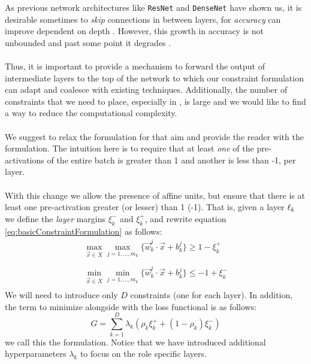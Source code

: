 As previous network architectures like \texttt{ResNet} and \texttt{DenseNet} have shown us, it is desirable sometimes to \emph{skip} connections in between layers, for \emph{accuracy} can improve dependent on depth \cite{resnet, densenet}. However, this growth in accuracy is not unbounded and past some point it degrades \cite{simpnet}. 
\\\\
Thus, it is important to provide a mechanism to forward the output of intermediate layers to the top of the network to which our constraint formulation can adapt and coalesce with existing techniques. Additionally, the number of constraints that we need to place, especially in \SepUnitPoint, is large and we would like to find a way to reduce the computational complexity.
\\\\
We suggest to relax the \SepUnit formulation for that aim and provide the reader with the \SepLayer formulation. The intuition here is to require that at least \emph{one} of the pre-activations of the entire batch is greater than 1 and another is less than -1, per layer.  
\\\\
With this change we allow the presence of affine units, but ensure that there is at least one pre-activation greater (or lesser) than 1 (-1). That is, given a layer $\ell_k$ we define the \emph{layer} margins $\xi^{-}_k$ and $\xi^{+}_k$, and rewrite equation \ref{eq:basicConstraintFormulation} as follows:
\begin{equation}\label{eq:layerSeparationConstraint}
\begin{array}{lcl}
    \displaystyle\max_{\vec{x}\in{X}}\max_{j=1,\ldots,m_k}\{\vec{w}^j_k\cdot\vec{x}+b^j_k\}\geq 1-\xi^{+}_k\\\\
    \displaystyle\min_{\vec{x}\in{X}}\min_{j=1,\ldots,m_k}\{\vec{w}^j_k\cdot\vec{x}+b^j_k\}\leq -1+\xi^{-}_k\\
\end{array}    
\end{equation}
We will need to introduce only $D$ constraints (one for each layer). In addition, the term to minimize alongside with the loss functional is as follows:
\begin{equation}\label{eq:constraintLossForLayerSeparation}
    G = \sum_{k=1}^{D}\lambda_k(\rho_{k}\xi^{+}_{k}+(1-\rho_{k})\xi^{-}_{k})
\end{equation}
we call this the \SepLayer formulation. Notice that we have introduced additional hyperparameters $\lambda_k$ to focus on the role specific layers.   


